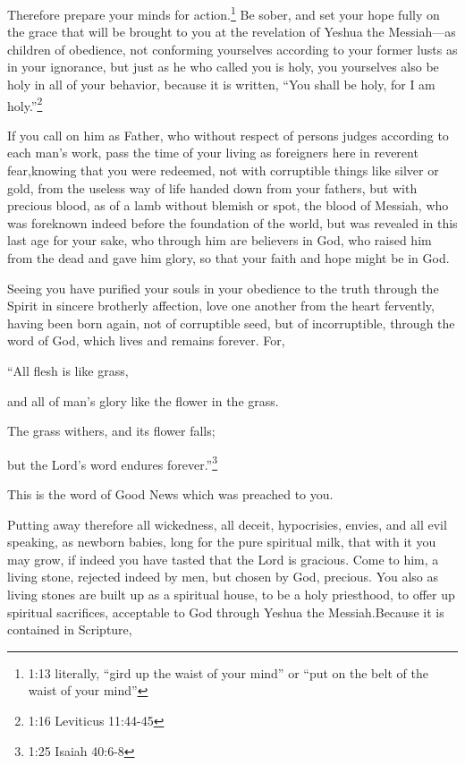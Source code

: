 \myverse{}Therefore prepare your minds for action.\footnote{1:13 literally, “gird up the waist of your mind” or “put on the belt of the waist of your mind”} Be sober, and set your hope fully on the grace that will be brought to you at the revelation of Yeshua the Messiah—\myverse{}as children of obedience, not conforming yourselves according to your former lusts as in your ignorance, \myverse{}but just as he who called you is holy, you yourselves also be holy in all of your behavior, \myverse{}because it is written, “You shall be holy, for I am holy.”\footnote{1:16 Leviticus 11:44-45}


\myverse{}If you call on him as Father, who without respect of persons judges according to each man’s work, pass the time of your living as foreigners here in reverent fear,\myverse{}knowing that you were redeemed, not with corruptible things like silver or gold, from the useless way of life handed down from your fathers, \myverse{}but with precious blood, as of a lamb without blemish or spot, the blood of Messiah, \myverse{}who was foreknown indeed before the foundation of the world, but was revealed in this last age for your sake, \myverse{}who through him are believers in God, who raised him from the dead and gave him glory, so that your faith and hope might be in God.


\myverse{}Seeing you have purified your souls in your obedience to the truth through the Spirit in sincere brotherly affection, love one another from the heart fervently, \myverse{}having been born again, not of corruptible seed, but of incorruptible, through
the word of God, which lives and remains forever. \myverse{}For,

“All flesh is like grass,

and all of man’s glory like the flower in the grass.

The grass withers, and its flower falls;


\myverse{}but the Lord’s word endures forever.”\footnote{1:25 Isaiah 40:6-8}

This is the word of Good News which was preached to you.


\mychapter{} \myverse*{}Putting away therefore all wickedness, all deceit, hypocrisies, envies, and all evil speaking, \myverse{}as newborn babies, long for the pure spiritual milk, that with it you may grow, \myverse{}if indeed you have tasted that the Lord is gracious. \myverse{}Come to him, a living stone, rejected indeed by men, but chosen by God, precious. \myverse{}You also as living stones are built up as a spiritual house, to be a holy priesthood, to offer up spiritual sacrifices, acceptable to God through Yeshua the Messiah.\myverse{}Because it is contained in Scripture,

